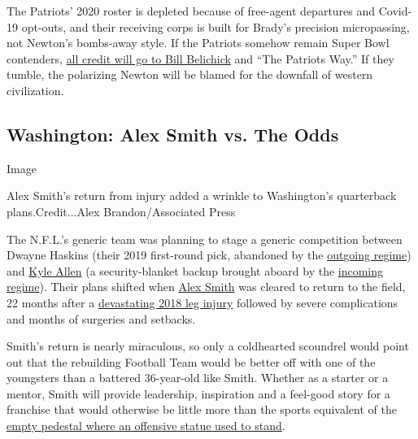 The Patriots' 2020 roster is depleted because of free-agent departures
and Covid-19 opt-outs, and their receiving corps is built for Brady's
precision micropassing, not Newton's bombs-away style. If the Patriots
somehow remain Super Bowl contenders,
\href{https://www.nytimes3xbfgragh.onion/2020/06/29/sports/football/cam-newton-patriots-deal.html}{all
credit will go to Bill Belichick} and ``The Patriots Way.'' If they
tumble, the polarizing Newton will be blamed for the downfall of western
civilization.

\hypertarget{washington-alex-smith-vs-the-odds}{%
\subsection{Washington: Alex Smith vs. The
Odds}\label{washington-alex-smith-vs-the-odds}}

Image

Alex Smith's return from injury added a wrinkle to Washington's
quarterback plans.Credit...Alex Brandon/Associated Press

The N.F.L.'s generic team was planning to stage a generic competition
between Dwayne Haskins (their 2019 first-round pick, abandoned by the
\href{https://www.nytimes3xbfgragh.onion/2019/10/07/sports/jay-gruden-redskins.html}{outgoing
regime}) and
\href{https://www.nytimes3xbfgragh.onion/interactive/2019/11/06/sports/football/06nfl-allens-quiz.html}{Kyle
Allen} (a security-blanket backup brought aboard by the
\href{https://www.nytimes3xbfgragh.onion/2019/12/31/sports/football/ron-rivera-washington-redskins.html}{incoming
regime}). Their plans shifted when
\href{https://www.nytimes3xbfgragh.onion/2018/11/18/sports/alex-smith-injury-redskins-texans.html}{Alex
Smith} was cleared to return to the field, 22 months after a
\href{https://www.nytimes3xbfgragh.onion/2018/11/18/sports/alex-smith-injury-joe-theismann.html}{devastating
2018 leg injury} followed by severe complications and months of
surgeries and setbacks.

Smith's return is nearly miraculous, so only a coldhearted scoundrel
would point out that the rebuilding Football Team would be better off
with one of the youngsters than a battered 36-year-old like Smith.
Whether as a starter or a mentor, Smith will provide leadership,
inspiration and a feel-good story for a franchise that would otherwise
be little more than the sports equivalent of the
\href{https://www.nytimes3xbfgragh.onion/2020/06/19/sports/baseball/statue-removed-rfk-twins.html}{empty
pedestal where an offensive statue used to stand}.


